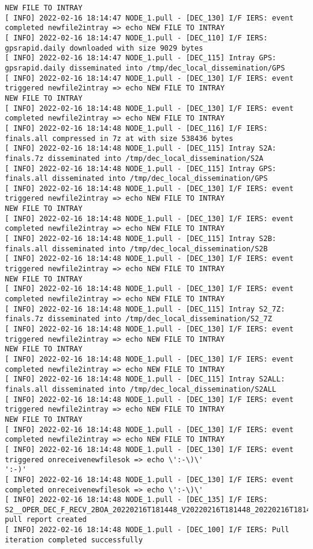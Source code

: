 \documentclass[dec_sum_main.tex]{subfiles}
\begin{document}
\begin{Verbatim}[fontsize=\tiny]
NEW FILE TO INTRAY
[ INFO] 2022-02-16 18:14:47 NODE_1.pull - [DEC_130] I/F IERS: event completed newfile2intray => echo NEW FILE TO INTRAY
[ INFO] 2022-02-16 18:14:47 NODE_1.pull - [DEC_110] I/F IERS: gpsrapid.daily downloaded with size 9029 bytes
[ INFO] 2022-02-16 18:14:47 NODE_1.pull - [DEC_115] Intray GPS: gpsrapid.daily disseminated into /tmp/dec_local_dissemination/GPS
[ INFO] 2022-02-16 18:14:47 NODE_1.pull - [DEC_130] I/F IERS: event triggered newfile2intray => echo NEW FILE TO INTRAY
NEW FILE TO INTRAY
[ INFO] 2022-02-16 18:14:48 NODE_1.pull - [DEC_130] I/F IERS: event completed newfile2intray => echo NEW FILE TO INTRAY
[ INFO] 2022-02-16 18:14:48 NODE_1.pull - [DEC_116] I/F IERS: finals.all compressed in 7z at with size 538436 bytes
[ INFO] 2022-02-16 18:14:48 NODE_1.pull - [DEC_115] Intray S2A: finals.7z disseminated into /tmp/dec_local_dissemination/S2A
[ INFO] 2022-02-16 18:14:48 NODE_1.pull - [DEC_115] Intray GPS: finals.all disseminated into /tmp/dec_local_dissemination/GPS
[ INFO] 2022-02-16 18:14:48 NODE_1.pull - [DEC_130] I/F IERS: event triggered newfile2intray => echo NEW FILE TO INTRAY
NEW FILE TO INTRAY
[ INFO] 2022-02-16 18:14:48 NODE_1.pull - [DEC_130] I/F IERS: event completed newfile2intray => echo NEW FILE TO INTRAY
[ INFO] 2022-02-16 18:14:48 NODE_1.pull - [DEC_115] Intray S2B: finals.all disseminated into /tmp/dec_local_dissemination/S2B
[ INFO] 2022-02-16 18:14:48 NODE_1.pull - [DEC_130] I/F IERS: event triggered newfile2intray => echo NEW FILE TO INTRAY
NEW FILE TO INTRAY
[ INFO] 2022-02-16 18:14:48 NODE_1.pull - [DEC_130] I/F IERS: event completed newfile2intray => echo NEW FILE TO INTRAY
[ INFO] 2022-02-16 18:14:48 NODE_1.pull - [DEC_115] Intray S2_7Z: finals.7z disseminated into /tmp/dec_local_dissemination/S2_7Z
[ INFO] 2022-02-16 18:14:48 NODE_1.pull - [DEC_130] I/F IERS: event triggered newfile2intray => echo NEW FILE TO INTRAY
NEW FILE TO INTRAY
[ INFO] 2022-02-16 18:14:48 NODE_1.pull - [DEC_130] I/F IERS: event completed newfile2intray => echo NEW FILE TO INTRAY
[ INFO] 2022-02-16 18:14:48 NODE_1.pull - [DEC_115] Intray S2ALL: finals.all disseminated into /tmp/dec_local_dissemination/S2ALL
[ INFO] 2022-02-16 18:14:48 NODE_1.pull - [DEC_130] I/F IERS: event triggered newfile2intray => echo NEW FILE TO INTRAY
NEW FILE TO INTRAY
[ INFO] 2022-02-16 18:14:48 NODE_1.pull - [DEC_130] I/F IERS: event completed newfile2intray => echo NEW FILE TO INTRAY
[ INFO] 2022-02-16 18:14:48 NODE_1.pull - [DEC_130] I/F IERS: event triggered onreceivenewfilesok => echo \':-\)\'
':-)'
[ INFO] 2022-02-16 18:14:48 NODE_1.pull - [DEC_130] I/F IERS: event completed onreceivenewfilesok => echo \':-\)\'
[ INFO] 2022-02-16 18:14:48 NODE_1.pull - [DEC_135] I/F IERS: S2__OPER_DEC_F_RECV_2BOA_20220216T181448_V20220216T181448_20220216T181448_IERS.xml pull report created
[ INFO] 2022-02-16 18:14:48 NODE_1.pull - [DEC_100] I/F IERS: Pull iteration completed successfully


\end{Verbatim}
\end{document}
